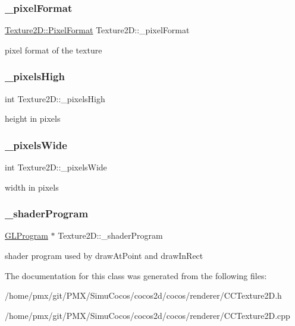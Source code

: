 \subsubsection{\texorpdfstring{\+\_\+pixel\+Format}{\_pixelFormat}}
{\footnotesize\ttfamily \hyperlink{classTexture2D_a45d9d8bb5a0669def36bbdfbfb91d220}{Texture2\+D\+::\+Pixel\+Format} Texture2\+D\+::\+\_\+pixel\+Format\hspace{0.3cm}{\ttfamily [protected]}}

pixel format of the texture \mbox{\label{classTexture2D_a956e691335f81bbba88519433f3dd32a}} 
\subsubsection{\texorpdfstring{\+\_\+pixels\+High}{\_pixelsHigh}}
{\footnotesize\ttfamily int Texture2\+D\+::\+\_\+pixels\+High\hspace{0.3cm}{\ttfamily [protected]}}

height in pixels \mbox{\label{classTexture2D_aafe73e21b23f281bf37f8747681bd597}} 
\subsubsection{\texorpdfstring{\+\_\+pixels\+Wide}{\_pixelsWide}}
{\footnotesize\ttfamily int Texture2\+D\+::\+\_\+pixels\+Wide\hspace{0.3cm}{\ttfamily [protected]}}

width in pixels \mbox{\label{classTexture2D_a446077c65f0e78f1f6cd91058cf8634a}} 
\subsubsection{\texorpdfstring{\+\_\+shader\+Program}{\_shaderProgram}}
{\footnotesize\ttfamily \hyperlink{classGLProgram}{G\+L\+Program} $\ast$ Texture2\+D\+::\+\_\+shader\+Program\hspace{0.3cm}{\ttfamily [protected]}}

shader program used by draw\+At\+Point and draw\+In\+Rect 

The documentation for this class was generated from the following files\+:\begin{DoxyCompactItemize}
\item 
/home/pmx/git/\+P\+M\+X/\+Simu\+Cocos/cocos2d/cocos/renderer/C\+C\+Texture2\+D.\+h\item 
/home/pmx/git/\+P\+M\+X/\+Simu\+Cocos/cocos2d/cocos/renderer/C\+C\+Texture2\+D.\+cpp\end{DoxyCompactItemize}
